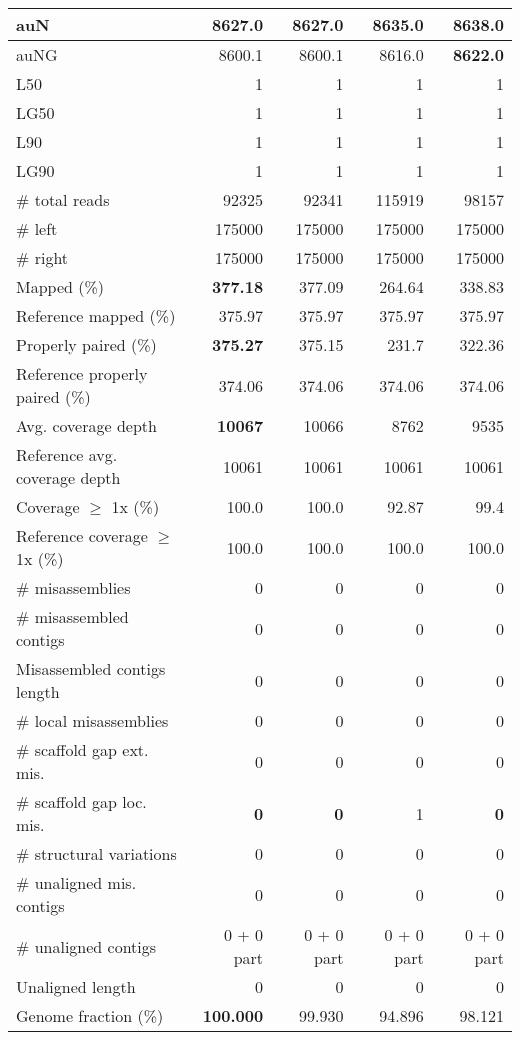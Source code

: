 \documentclass[12pt,a4paper]{article}
\begin{document}
\begin{table}[ht]
\begin{center}
\begin{tabular}{|l*{4}{|r}|}
auN & 8627.0 & 8627.0 & 8635.0 & {\bf 8638.0} \\ \hline
auNG & 8600.1 & 8600.1 & 8616.0 & {\bf 8622.0} \\ \hline
L50 & 1 & 1 & 1 & 1 \\ \hline
LG50 & 1 & 1 & 1 & 1 \\ \hline
L90 & 1 & 1 & 1 & 1 \\ \hline
LG90 & 1 & 1 & 1 & 1 \\ \hline
\# total reads & 92325 & 92341 & 115919 & 98157 \\ \hline
\# left & 175000 & 175000 & 175000 & 175000 \\ \hline
\# right & 175000 & 175000 & 175000 & 175000 \\ \hline
Mapped (\%) & {\bf 377.18} & 377.09 & 264.64 & 338.83 \\ \hline
Reference mapped (\%) & 375.97 & 375.97 & 375.97 & 375.97 \\ \hline
Properly paired (\%) & {\bf 375.27} & 375.15 & 231.7 & 322.36 \\ \hline
Reference properly paired (\%) & 374.06 & 374.06 & 374.06 & 374.06 \\ \hline
Avg. coverage depth & {\bf 10067} & 10066 & 8762 & 9535 \\ \hline
Reference avg. coverage depth & 10061 & 10061 & 10061 & 10061 \\ \hline
Coverage $\geq$ 1x (\%) & 100.0 & 100.0 & 92.87 & 99.4 \\ \hline
Reference coverage $\geq$ 1x (\%) & 100.0 & 100.0 & 100.0 & 100.0 \\ \hline
\# misassemblies & 0 & 0 & 0 & 0 \\ \hline
\# misassembled contigs & 0 & 0 & 0 & 0 \\ \hline
Misassembled contigs length & 0 & 0 & 0 & 0 \\ \hline
\# local misassemblies & 0 & 0 & 0 & 0 \\ \hline
\# scaffold gap ext. mis. & 0 & 0 & 0 & 0 \\ \hline
\# scaffold gap loc. mis. & {\bf 0} & {\bf 0} & 1 & {\bf 0} \\ \hline
\# structural variations & 0 & 0 & 0 & 0 \\ \hline
\# unaligned mis. contigs & 0 & 0 & 0 & 0 \\ \hline
\# unaligned contigs & 0 + 0 part & 0 + 0 part & 0 + 0 part & 0 + 0 part \\ \hline
Unaligned length & 0 & 0 & 0 & 0 \\ \hline
Genome fraction (\%) & {\bf 100.000} & 99.930 & 94.896 & 98.121 \\ \hline

\end{tabular}
\end{center}
\end{table}
\end{document}
